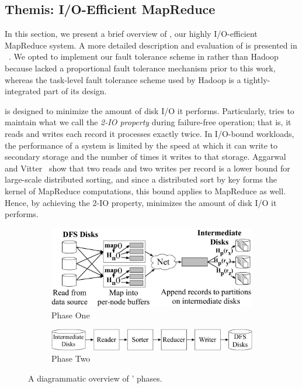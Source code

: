 \subsection{Themis: I/O-Efficient MapReduce}
\label{sec:themis}

In this section, we present a brief overview of \themis, our highly
I/O-efficient MapReduce system. A more detailed description and evaluation of
\themis is presented in ~\cite{themis}.  We opted to implement our fault
tolerance scheme in \themis rather than Hadoop because \themis lacked a
proportional fault tolerance mechanism prior to this work, whereas the
task-level fault tolerance scheme used by Hadoop is a tightly-integrated part
of its design.

 \themis is designed to minimize the amount of disk I/O it
 performs. Particularly, \themis tries to maintain what we call the \emph{2-IO
   property} during failure-free operation; that is, it reads and writes each
 record it processes exactly twice. In I/O-bound workloads, the performance of
 a system is limited by the speed at which it can write to secondary storage
 and the number of times it writes to that storage. Aggarwal and
 Vitter~\cite{sort-io} show that two reads and two writes per record is a lower
 bound for large-scale distributed sorting, and since a distributed sort by key
 forms the kernel of MapReduce computations, this bound applies to MapReduce as
 well. Hence, by achieving the 2-IO property, \themis minimizes the amount of
 disk I/O it performs.

\begin{figure}
  \centering
  \begin{subfigure}[t]{\columnwidth}
  \centering
  \includegraphics[width=\columnwidth]{fault_tolerance/figures/detailed_phase_one.pdf}
  \caption{\label{fig:phase_one} Phase One}
  \end{subfigure}\vspace{1em}
  \begin{subfigure}[t]{\columnwidth}
  \centering
  \includegraphics[width=\columnwidth]{fault_tolerance/figures/phase_two.pdf}
  \caption{\label{fig:phase_two} Phase Two}
  \end{subfigure}

  \caption{\label{fig:themis_phases} A diagrammatic overview of \themis' phases.}
\end{figure}


